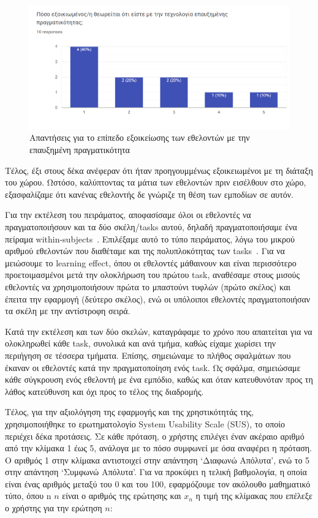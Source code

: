 \begin{figure}[!h]
    \centering
    \includegraphics[width=1\textwidth]{images/questionnaire_familiarityAR.png}
    \caption{Απαντήσεις για το επίπεδο εξοικείωσης των εθελοντών με την επαυξημένη πραγματικότητα}\label{fig:questARFamiliariaty}
\end{figure}

Τέλος, έξι στους δέκα ανέφεραν ότι ήταν προηγουμμένως εξοικειωμένοι με τη διάταξη του χώρου. Ωστόσο, καλύπτοντας τα μάτια των εθελοντών πριν εισέλθουν στο χώρο, εξασφαλίζαμε ότι κανένας εθελοντής δε γνώριζε τη θέση των εμποδίων σε αυτόν.

Για την εκτέλεση του πειράματος, αποφασίσαμε όλοι οι εθελοντές να πραγματοποιήσουν και τα δύο σκέλη/tasks αυτού, δηλαδή πραγματοποιήσαμε ένα πείραμα within-subjects~\cite{bhandari_2021_withinsubjects}. Επιλέξαμε αυτό το τύπο πειράματος, λόγω του μικρού αριθμού εθελοντών που διαθέταμε και της πολυπλοκότητας των tasks~\cite{lazar_2017_research}. Για να μειώσουμε το learning effect, όπου οι εθελοντές μάθαινουν και είναι περισσότερο προετοιμασμένοι μετά την ολοκλήρωση του πρώτου task, αναθέσαμε στους μισούς εθελοντές να χρησιμοποιήσουν πρώτα το μπαστούνι τυφλών (πρώτο σκέλος) και έπειτα την εφαρμογή (δεύτερο σκέλος), ενώ οι υπόλοιποι εθελοντές πραγματοποιήσαν τα σκέλη με την αντίστροφη σειρά.

Κατά την εκτέλεση και των δύο σκελών, καταγράφαμε το χρόνο που απαιτείται για να ολοκληρωθεί κάθε task, συνολικά και ανά τμήμα, καθώς είχαμε χωρίσει την περιήγηση σε τέσσερα τμήματα. Επίσης, σημειώναμε το πλήθος σφαλμάτων που έκαναν οι εθελοντές κατά την πραγματοποίηση ενός task. Ως σφάλμα, σημειώσαμε κάθε σύγκρουση ενός εθελοντή με ένα εμπόδιο, καθώς και όταν κατευθυνόταν προς τη λάθος κατεύθυνση και όχι προς το τέλος της διαδρομής.

Τέλος, για την αξιολόγηση της εφαρμογής και της χρηστικότητάς της, χρησιμοποιήθηκε το ερωτηματολογίο System Usability Scale (SUS), το οποίο περιέχει δέκα προτάσεις. Σε κάθε πρόταση, ο χρήστης επιλέγει έναν ακέραιο αριθμό από την κλίμακα 1 έως 5, ανάλογα με το πόσο συμφωνεί με όσα αναφέρει η πρόταση. Ο αριθμός 1 στην κλίμακα αντιστοιχεί στην απάντηση `Διαφωνώ Απόλυτα', ενώ το 5 στην απάντηση `Συμφωνώ Απόλυτα'. Για να προκύψει η τελική βαθμολογία, η οποία είναι ένας αριθμός μεταξύ του 0 και του 100, εφαρμόζουμε τον ακόλουθο μαθηματικό τύπο, όπου n $n$ είναι ο αριθμός της ερώτησης και $x_n$ η τιμή της κλίμακας που επέλεξε ο χρήστης για την ερώτηση $n$:

